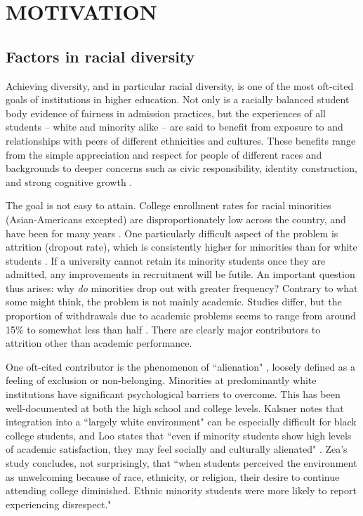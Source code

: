 \section{MOTIVATION}
\label{sec:intro}

\subsection{Factors in racial diversity}

Achieving diversity, and in particular racial diversity, is one of the most
oft-cited goals of institutions in higher education. Not only is a racially
balanced student body evidence of fairness in admission practices, but the
experiences of all students -- white and minority alike -- are said to benefit
from exposure to and relationships with peers of different ethnicities and
cultures. These benefits range from the simple appreciation and respect for
people of different races and backgrounds to deeper concerns such as civic
responsibility, identity construction, and strong cognitive growth
\cite{gurin_diversity_2002}.

The goal is not easy to attain. College enrollment rates for racial minorities
(Asian-Americans excepted) are disproportionately low across the country, and
have been for many years \cite{ryu_minorities_2010}. One particularly difficult
aspect of the problem is attrition (dropout rate), which is consistently
higher for minorities than for white students \cite{zea_predicting_1997}. If a
university cannot retain its minority students once they are admitted, any
improvements in recruitment will be futile. An important question thus
arises: why \textit{do} minorities drop out with greater frequency? Contrary
to what some might think, the problem is not mainly academic. Studies differ,
but the proportion of withdrawals due to academic problems seems to range from
around 15\% \cite{kalsner_issues_1991} to somewhat less than
half \cite{suen_alienation_1983}. There are clearly major contributors to
attrition other than academic performance.

One oft-cited contributor is the phenomenon of ``alienation"
\cite{burbach_development_1972,dean_alienation:_1961}, loosely defined as a
feeling of exclusion or non-belonging. Minorities at predominantly white
institutions have significant psychological barriers to overcome. This has
been well-documented at both the high school \cite{calabrese_structure_1988}
and college \cite{nora_role_1996} levels. Kalsner notes that integration into
a ``largely white environment" can be especially difficult for black college
students, and Loo states that ``even if minority students show high levels of
academic satisfaction, they may feel socially and culturally alienated"
\cite{loo_alienation_1986}. Zea's study concludes, not surprisingly, that
``when students perceived the environment as unwelcoming because of race,
ethnicity, or religion, their desire to continue attending college diminished.
Ethnic minority students were more likely to report experiencing disrespect."
\cite{zea_predicting_1997}

